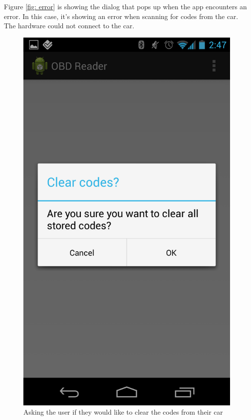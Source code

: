 \documentclass[12pt,letterpaper]{article}
\begin{document}
Figure \ref{fig: error} is showing the dialog that pops up when the
app encounters an error. In this case, it's showing an error when
scanning for codes from the car. The hardware could not connect to the
car.

\begin{figure}[H]
\centering
\includegraphics[totalheight=15cm]{images/clearcodes.png}
\caption{Asking the user if they would like to clear the codes from
  their car}
\label{fig: clearcodes}
\end{figure}
\end{document}
